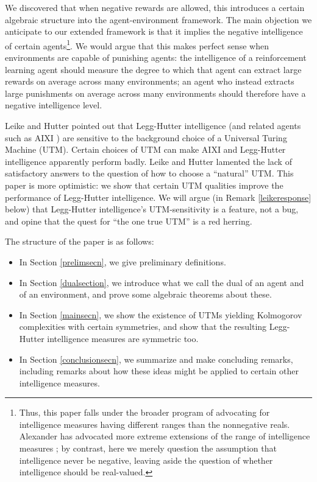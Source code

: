 \documentclass{article}
\begin{document}
We discovered that when negative rewards are allowed, this
introduces a certain algebraic structure into the agent-environment framework. The
main objection we anticipate to our extended framework
is that it implies the negative intelligence of certain
agents\footnote{Thus, this paper falls under the broader
program of advocating for intelligence measures having different ranges than
the nonnegative reals. Alexander has advocated
more extreme extensions of the range of intelligence measures
\cite{alexander2020archimedean} \cite{alexander2021measuring}; by contrast,
here we merely question the
assumption that intelligence never be negative, leaving aside the
question of whether intelligence should be real-valued.}.
We would argue that this makes perfect sense when environments are capable of punishing
agents: the intelligence of a reinforcement learning agent should measure the
degree to which that agent can extract large rewards on average across many environments;
an agent who instead extracts large punishments on average across many environments
should therefore have a negative intelligence level.

Leike and Hutter \cite{leike2015bad} pointed out that Legg-Hutter intelligence
(and related agents such as AIXI \cite{hutter2004universal}) are sensitive
to the background choice of a Universal
Turing Machine (UTM). Certain choices of UTM can make AIXI and Legg-Hutter intelligence
apparently perform badly. Leike and Hutter lamented the lack of satisfactory answers to
the question of how to choose a ``natural'' UTM. This paper is more optimistic:
we show that certain UTM qualities improve the performance of Legg-Hutter
intelligence. We will argue (in Remark \ref{leikeresponse} below)
that Legg-Hutter intelligence's UTM-sensitivity is
a feature, not a bug, and opine that the quest for ``the one true UTM'' is
a red herring.

The structure of the paper is as follows:
\begin{itemize}
    \item In Section \ref{prelimsecn}, we give preliminary definitions.
    \item In Section \ref{dualsection}, we introduce what we call the dual of an agent and of
        an environment, and prove some algebraic theorems about these.
    \item In Section \ref{mainsecn}, we show the existence of UTMs yielding Kolmogorov
        complexities with certain symmetries, and show that the resulting Legg-Hutter
        intelligence measures are symmetric too.
    \item In Section \ref{conclusionsecn}, we summarize and make concluding remarks, including
        remarks about how these ideas might be applied to certain other intelligence measures.
\end{itemize}
\end{document}
